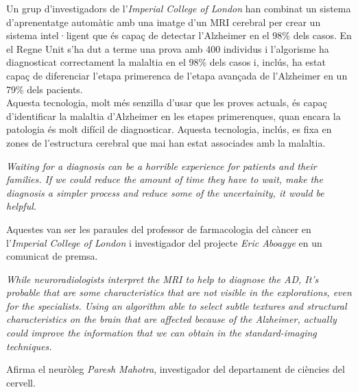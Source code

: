 \documentclass[a4paper,12pt]{report}
\begin{document}
\begin{center}
    \begin{minipage}{0.9\linewidth}
        \vspace{5pt}
        {\small
            Un grup d'investigadors de l'\textit{Imperial College of London} han combinat un sistema d'aprenentatge automàtic amb una imatge d'un MRI cerebral per crear un sistema intel·ligent que és capaç de detectar l'Alzheimer en el 98\% dels casos. En el Regne Unit s'ha dut a terme una prova amb 400 individus i l'algorisme ha diagnosticat correctament la malaltia en el 98\% dels casos i, inclús, ha estat capaç de diferenciar l'etapa primerenca de l'etapa avançada de l'Alzheimer en un 79\% dels pacients.\\
            Aquesta tecnologia, molt més senzilla d'usar que les proves actuals, és capaç d'identificar la malaltia d'Alzheimer en les etapes primerenques, quan encara la patologia és molt difícil de diagnosticar. Aquesta tecnologia, inclús, es fixa en zones de l'estructura cerebral que mai han estat associades amb la malaltia.\\
            \begin{center}
                \begin{minipage}{0.9\linewidth}
                    \vspace{5pt}
                    {\small \textit{Waiting for a diagnosis can be a horrible experience for patients and their families. If we could reduce the amount of time they have to wait, make the diagnosis a simpler process and reduce some of the uncertainity, it would be helpful.}
                    }
                    \vspace{20pt}
                \end{minipage}
            \end{center}
            Aquestes van ser les paraules del professor de farmacologia del càncer en l'\textit{Imperial College of London} i investigador del projecte \textit{Eric Aboagye} en un comunicat de premsa.\\
            \begin{center}
                \begin{minipage}{0.9\linewidth}
                    \vspace{5pt}
                    {\small \textit{While neuroradiologists interpret the MRI to help to diagnose the AD, It's probable that are some characteristics that are not visible in the explorations, even for the specialists. Using an algorithm able to select subtle textures and structural characteristics on the brain that are affected because of the Alzheimer, actually could improve the information that we can obtain in the standard-imaging techniques.}
                    }
                    \vspace{20pt}
                \end{minipage}
            \end{center}
            Afirma el neuròleg \textit{Paresh Mahotra}, investigador del departament de ciències del cervell.
        }
        \vspace{5pt}
    \end{minipage}
\end{center}
\end{document}
